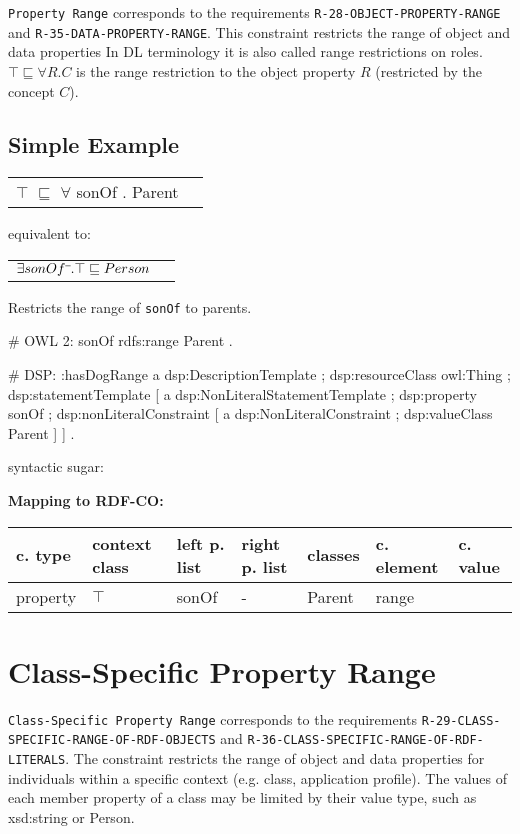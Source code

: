 \documentclass{llncs}
\newcommand{\ms}[1]{\texttt{#1}}
\newenvironment{gcotable}{
  \scriptsize
  \sffamily
  \vspace{0cm}
	\begin{center}
	\textbf{\vspace{0.4cm}Mapping to RDF-CO:} \\
  \begin{tabular}{l|l|l|l|l|l|l}
	\hline
  \textbf{c. type} & \textbf{context class} & \textbf{left p. list} & \textbf{right p. list} & \textbf{classes} & \textbf{c. element} & \textbf{c. value} \\
  \hline

}{
  \hline
  \end{tabular}
	\end{center}
}
\newenvironment{DL}{
  \vspace{0cm}
	\begin{center}
  \begin{tabular}{r l}

}{
  \end{tabular}
	\end{center}
}
\begin{document}
\ms{Property Range} corresponds to the requirements \ms{R-28-OBJECT-PROPERTY-RANGE} and \ms{R-35-DATA-PROPERTY-RANGE}.
This constraint restricts the range of object and data properties
In DL terminology it is also called range restrictions on roles.
$\top \sqsubseteq \forall R . C$ is the range restriction to the object property $R$ (restricted by the concept $C$).  

\subsection{Simple Example}

\begin{DL}
$\top$ $\sqsubseteq$ $\forall$ sonOf . Parent \\
\end{DL}

equivalent to:

\begin{DL}
$\exists sonOf\sp{\overline{\ }}.\top \sqsubseteq Person$
\end{DL}

Restricts the range of \ms{sonOf} to parents.

\begin{ex}
# OWL 2:
sonOf rdfs:range Parent . 
\end{ex}

\begin{ex}
# DSP:
:hasDogRange
        a dsp:DescriptionTemplate ; 
        dsp:resourceClass owl:Thing ; 
        dsp:statementTemplate [
            a dsp:NonLiteralStatementTemplate ;
            dsp:property sonOf ; 
            dsp:nonLiteralConstraint [ 
                a dsp:NonLiteralConstraint ;
                dsp:valueClass Parent ] ] .
\end{ex}

syntactic sugar:

\begin{gcotable}
property & $\top$ & sonOf & - & Parent & range \\
\end{gcotable}

\section{Class-Specific Property Range}

\ms{Class-Specific Property Range} corresponds to the requirements
\ms{R-29-CLASS-} \ms{SPECIFIC-RANGE-OF-RDF-OBJECTS} and \ms{R-36-CLASS-SPECIFIC-RANGE-OF-RDF-} \ms{LITERALS}.
The constraint restricts the range of object and data properties for individuals within a specific context (e.g. class, application profile).
The values of each member property of a class may be limited by their value type, such as xsd:string or Person. 
\end{document}
